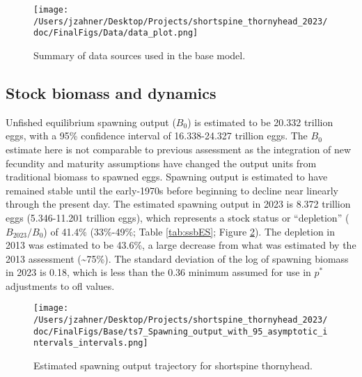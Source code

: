 \documentclass[11pt,
  english,
  letterpaper,
]{article}
\begin{document}
\begin{figure}
\centering
\texttt{[image: /Users/jzahner/Desktop/Projects/shortspine\_thornyhead\_2023/doc/FinalFigs/Data/data\_plot.png]}
\caption{Summary of data sources used in the base model.\label{fig:assessment_data_timeseriesES}}
\end{figure}

\hypertarget{stock-biomass-and-dynamics}{%
\subsection*{Stock biomass and dynamics}\label{stock-biomass-and-dynamics}}

Unfished equilibrium spawning output (\(B_0\)) is estimated to be 20.332 trillion eggs, with a 95\% confidence interval of 16.338-24.327 trillion eggs. The \(B_0\) estimate here is not comparable to previous assessment as the integration of new fecundity and maturity assumptions have changed the output units from traditional biomass to spawned eggs. Spawning output is estimated to have remained stable until the early-1970s before beginning to decline near linearly through the present day. The estimated spawning output in 2023 is 8.372 trillion eggs (5.346-11.201 trillion eggs), which represents a stock status or ``depletion'' (\(B_{2023}/B_0\)) of 41.4\% (33\%-49\%; Table \ref{tab:ssbES}; Figure \ref{fig:ssb_trajectoryES}). The depletion in 2013 was estimated to be 43.6\%, a large decrease from what was estimated by the 2013 assessment (\textasciitilde75\%). The standard deviation of the log of spawning biomass in 2023 is 0.18, which is less than the 0.36 minimum assumed for use in \(p^*\) adjustments to \gls{ofl} values.

\begin{figure}
\centering
\texttt{[image: /Users/jzahner/Desktop/Projects/shortspine\_thornyhead\_2023/doc/FinalFigs/Base/ts7\_Spawning\_output\_with\_95\_asymptotic\_intervals\_intervals.png]}
\caption{Estimated spawning output trajectory for shortspine thornyhead.\label{fig:ssb_trajectoryES}}
\end{figure}

\begingroup\fontsize{10}{12}\selectfont
\begingroup\fontsize{10}{12}\selectfont
\end{document}
